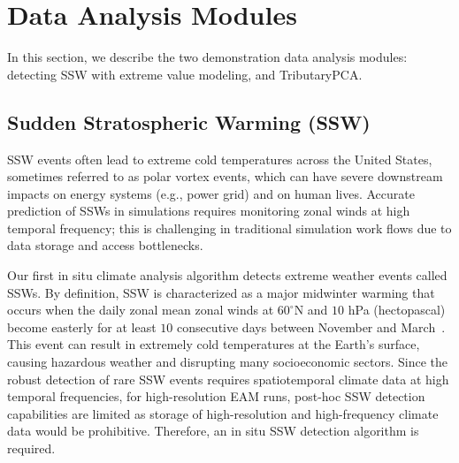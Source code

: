 \documentclass{juliacon}
\begin{document}
\section{Data Analysis Modules} \label{sec4}
In this section, we describe the two demonstration data analysis modules: detecting SSW with extreme value modeling, and TributaryPCA.

\subsection{Sudden Stratospheric Warming (SSW)}

SSW events often lead to extreme cold temperatures across the United States, sometimes referred to as polar vortex events, which can have severe downstream impacts on energy systems (e.g., power grid) and on human lives. Accurate prediction of SSWs in simulations requires monitoring zonal winds at high temporal frequency; this is challenging in traditional simulation work flows due to data storage and access bottlenecks.




Our first in situ climate analysis algorithm detects extreme weather events called SSWs. By definition, SSW is characterized as a major midwinter warming that occurs when the daily zonal mean zonal winds at $60^{\circ}$N and $10$ hPa (hectopascal) become easterly for at least $10$ consecutive days between November and March~\cite{ssw,ssw_def}. This event can result in extremely cold temperatures at the Earth's surface, causing hazardous weather and disrupting many socioeconomic sectors. Since the robust detection of rare SSW events requires spatiotemporal climate data at high temporal frequencies, for high-resolution EAM runs, post-hoc SSW detection capabilities are limited as storage of high-resolution and high-frequency climate data would be prohibitive. Therefore, an in situ SSW detection algorithm is required.
\end{document}
